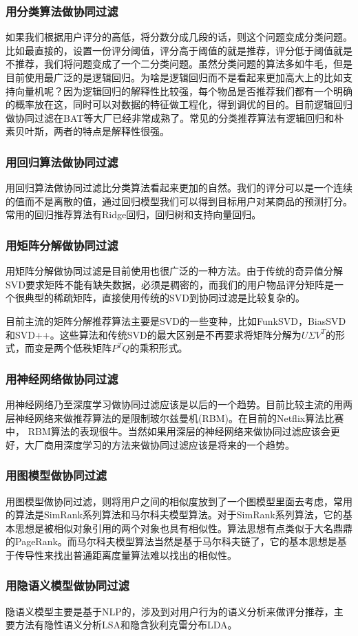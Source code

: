 \documentclass[12pt]{article}
\begin{document}
\subsubsection{用分类算法做协同过滤}
如果我们根据用户评分的高低，将分数分成几段的话，则这个问题变成分类问题。比如最直接的，设置一份评分阈值，评分高于阈值的就是推荐，评分低于阈值就是不推荐，我们将问题变成了一个二分类问题。虽然分类问题的算法多如牛毛，但是目前使用最广泛的是逻辑回归。为啥是逻辑回归而不是看起来更加高大上的比如支持向量机呢？因为逻辑回归的解释性比较强，每个物品是否推荐我们都有一个明确的概率放在这，同时可以对数据的特征做工程化，得到调优的目的。目前逻辑回归做协同过滤在BAT等大厂已经非常成熟了。常见的分类推荐算法有逻辑回归和朴素贝叶斯，两者的特点是解释性很强。

\subsubsection{用回归算法做协同过滤}
用回归算法做协同过滤比分类算法看起来更加的自然。我们的评分可以是一个连续的值而不是离散的值，通过回归模型我们可以得到目标用户对某商品的预测打分。常用的回归推荐算法有Ridge回归，回归树和支持向量回归。

\subsubsection{用矩阵分解做协同过滤}
用矩阵分解做协同过滤是目前使用也很广泛的一种方法。由于传统的奇异值分解SVD要求矩阵不能有缺失数据，必须是稠密的，而我们的用户物品评分矩阵是一个很典型的稀疏矩阵，直接使用传统的SVD到协同过滤是比较复杂的。

目前主流的矩阵分解推荐算法主要是SVD的一些变种，比如FunkSVD，BiasSVD和SVD++。这些算法和传统SVD的最大区别是不再要求将矩阵分解为$UΣV^T$的形式，而变是两个低秩矩阵$P^TQ$的乘积形式。

\subsubsection{用神经网络做协同过滤}
用神经网络乃至深度学习做协同过滤应该是以后的一个趋势。目前比较主流的用两层神经网络来做推荐算法的是限制玻尔兹曼机(RBM)。在目前的Netflix算法比赛中， RBM算法的表现很牛。当然如果用深层的神经网络来做协同过滤应该会更好，大厂商用深度学习的方法来做协同过滤应该是将来的一个趋势。

\subsubsection{用图模型做协同过滤}
用图模型做协同过滤，则将用户之间的相似度放到了一个图模型里面去考虑，常用的算法是SimRank系列算法和马尔科夫模型算法。对于SimRank系列算法，它的基本思想是被相似对象引用的两个对象也具有相似性。算法思想有点类似于大名鼎鼎的PageRank。而马尔科夫模型算法当然是基于马尔科夫链了，它的基本思想是基于传导性来找出普通距离度量算法难以找出的相似性。

\subsubsection{用隐语义模型做协同过滤}
隐语义模型主要是基于NLP的，涉及到对用户行为的语义分析来做评分推荐，主要方法有隐性语义分析LSA和隐含狄利克雷分布LDA。




\end{document}
